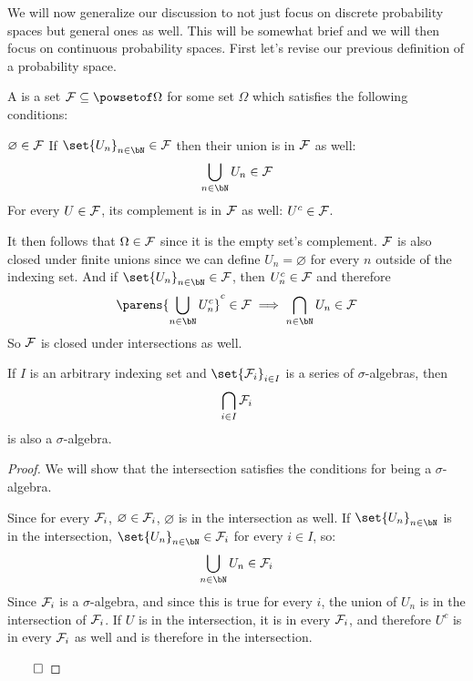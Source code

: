 We will now generalize our discussion to not just focus on discrete probability spaces but general ones as well.
This will be somewhat brief and we will then focus on continuous probability spaces.
First let's revise our previous definition of a probability space.

\begin{defn*}

	A  is a set $\cF\subseteq\powsetof\Omega$ for some set $\Omega$ which satisfies the
	following conditions:
	\begin{msecenumerate}
		\mitem $\varnothing\in{\cal F}$
		\mitem If $\set{U_n}_{n\in\bN}\in\cF$ then their union is in ${\cal F}$ as well:
		\[ \bigcup_{n\in\bN}U_n\in\cF \]
		\mitem For every $U\in{\cal F}$, its complement is in ${\cal F}$ as well: $U^c\in{\cal F}$.
	\end{msecenumerate}

\end{defn*}

It then follows that $\Omega\in{\cal F}$ since it is the empty set's complement.
${\cal F}$ is also closed under finite unions since we can define $U_n=\varnothing$ for every $n$ outside of the indexing
set.
And if $\set{U_n}_{n\in\bN}\in\cF$, then $U_n^c\in{\cal F}$ and therefore
\[ \parens{\bigcup_{n\in\bN}U_n^c}^c\in\cF \implies \bigcap_{n\in\bN}U_n\in\cF \]
So ${\cal F}$ is closed under intersections as well.

\begin{prop*}

	If $I$ is an arbitrary indexing set and $\set{\cF_i}_{i\in I}$ is a series of $\sigma$-algebras, then
	\[ \bigcap_{i\in I}{\cal F}_i \]
	is also a $\sigma$-algebra.

\end{prop*}

\begin{proof}

	We will show that the intersection satisfies the conditions for being a $\sigma$-algebra.

	\begin{msecenumerate}[0pt]
		\mitem Since for every ${\cal F}_i$, $\varnothing\in{\cal F}_i$, $\varnothing$ is in the intersection as well.
		\mitem If $\set{U_n}_{n\in\bN}$ is in the intersection, $\set{U_n}_{n\in\bN}\in\cF_i$ for every $i\in I$, so:
		\[ \bigcup_{n\in\bN}U_n\in\cF_i \]
		Since ${\cal F}_i$ is a $\sigma$-algebra, and since this is true for every $i$, the union of $U_n$ is in the
		intersection of ${\cal F}_i$.
		\mitem If $U$ is in the intersection, it is in every ${\cal F}_i$, and therefore $U^c$ is in every ${\cal F}_i$ as well
		and is therefore in the intersection.
	\end{msecenumerate} 

	\hfill$\qed$

\end{proof}


